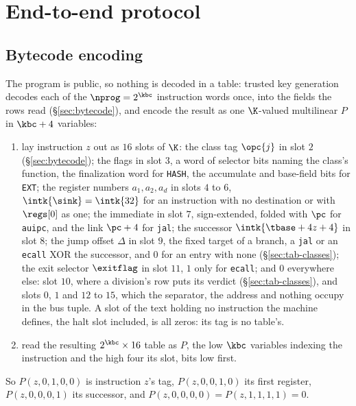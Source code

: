 \section{End-to-end protocol}\label{sec:e2e}

\subsection{Bytecode encoding}\label{sec:e2e-bc}

The program is public, so nothing is decoded in a table: trusted key generation decodes each of the $\nprog=2^{\kbc}$ instruction words once, into the fields the rows read (\S\ref{sec:bytecode}), and encode the result as one $\K$-valued multilinear $P$ in $\kbc+4$ variables:
\begin{enumerate}[itemsep=1pt,topsep=3pt]
\item lay instruction $z$ out as $16$ slots of $\K$: the class tag $\opc{j}$ in slot $2$ (\S\ref{sec:bytecode}); the flags in slot $3$, a word of selector bits naming the class's function, the finalization word for \texttt{HASH}, the accumulate and base-field bits for \texttt{EXT}; the register numbers $a_1,a_2,a_d$ in slots $4$ to $6$, $\intk{\sink}=\intk{32}$ for an instruction with no destination or with $\regs[0]$ as one; the immediate in slot $7$, sign-extended, folded with $\pc$ for \texttt{auipc}, and the link $\pc+4$ for \texttt{jal}; the successor $\intk{\tbase+4z+4}$ in slot $8$; the jump offset $\Delta$ in slot $9$, the fixed target of a branch, a \texttt{jal} or an \texttt{ecall} XOR the successor, and $0$ for an entry with none (\S\ref{sec:tab-classes}); the exit selector $\exitflag$ in slot $11$, $1$ only for \texttt{ecall}; and $0$ everywhere else: slot $10$, where a division's row puts its verdict (\S\ref{sec:tab-classes}), and slots $0$, $1$ and $12$ to $15$, which the separator, the address and nothing occupy in the bus tuple. A slot of the text holding no instruction the machine defines, the halt slot included, is all zeros: its tag is no table's.
\item read the resulting $2^{\kbc}\times16$ table as $P$, the low $\kbc$ variables indexing the instruction and the high four its slot, bits low first.
\end{enumerate}
So $P(z,0,1,0,0)$ is instruction $z$'s tag, $P(z,0,0,1,0)$ its first register, $P(z,0,0,0,1)$ its successor, and $P(z,0,0,0,0)=P(z,1,1,1,1)=0$.

